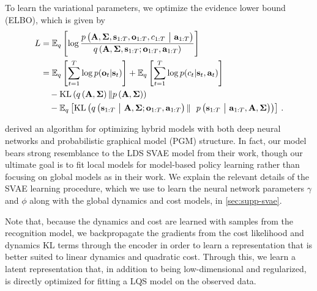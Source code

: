 To learn the variational parameters, we optimize the evidence lower bound (ELBO), which is given by
\begin{align*}
    L&=\mathbb{E}_q\left[\log\frac{p\left(\mathbf{A},\bm{\Sigma},\mathbf{s}_{1:T},\mathbf{o}_{1:T},c_{1:T}~\big|~\mathbf{a}_{1:T}\right)}{q\left(\mathbf{A},\bm{\Sigma},\mathbf{s}_{1:T};\mathbf{o}_{1:T},\mathbf{a}_{1:T}\right)}\right]\\
    &=\mathbb{E}_q\left[\sum_{t=1}^{T}\log{p}(\mathbf{o}_t|\mathbf{s}_t)\right]+\mathbb{E}_q\left[\sum_{t=1}^{T}\log{p}(c_t|\mathbf{s}_t,\mathbf{a}_t)\right]\\
    &\hspace{1em}-\mathrm{KL}\left(q\left(\mathbf{A},\bm{\Sigma}\right)\|p\left(\mathbf{A},\bm{\Sigma}\right)\right)\\
    &\hspace{1em}-\mathbb{E}_q\left[\mathrm{KL}\left(q\left(\mathbf{s}_{1:T}~\big|~\mathbf{A},\bm{\Sigma};\mathbf{o}_{1:T},\mathbf{a}_{1:T}\right)\|\right.\right.\left.\left.p\left(\mathbf{s}_{1:T}~\big|~\mathbf{a}_{1:T},\mathbf{A},\bm{\Sigma}\right)\right)\right]\,.
\end{align*}

\citet{svae} derived an algorithm for optimizing hybrid models with both deep neural networks and probabilistic graphical model (PGM) structure. In fact, our model bears strong resemblance to the LDS SVAE model from their work, though our ultimate goal is to fit local models for model-based policy learning rather than focusing on global models as in their work. We explain the relevant details of the SVAE learning procedure, which we use to learn the neural network parameters $\gamma$ and $\phi$ along with the global dynamics and cost models, in \autoref{sec:supp-svae}.

Note that, because the dynamics and cost are learned with samples from the recognition model, we backpropagate the gradients from the cost likelihood and dynamics KL terms through the encoder in order to learn a representation that is better suited to linear dynamics and quadratic cost. Through this, we learn a latent representation that, in addition to being low-dimensional and regularized, is directly optimized for fitting a LQS model on the observed data.

